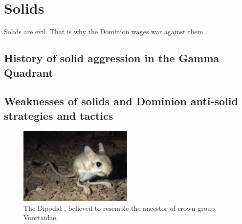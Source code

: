 


\chapter{Solids}
\label{ch:Solids}
Solids are evil. That is why the Dominion  wages war against them \citep{Son-of-Moog:2488}.

\section{History of solid aggression in the Gamma Quadrant}
\section{Weaknesses of solids and Dominion anti-solid strategies and tactics}
\begin{figure}[h!]
 \label{jaculus}
 \centering
  \includegraphics[width=0.5\textwidth]{ch-solids/figures/jaculus.jpg}
 \caption{The Dipodid , believed to resemble the ancestor of crown-group Voortaidae.}
\end{figure}




